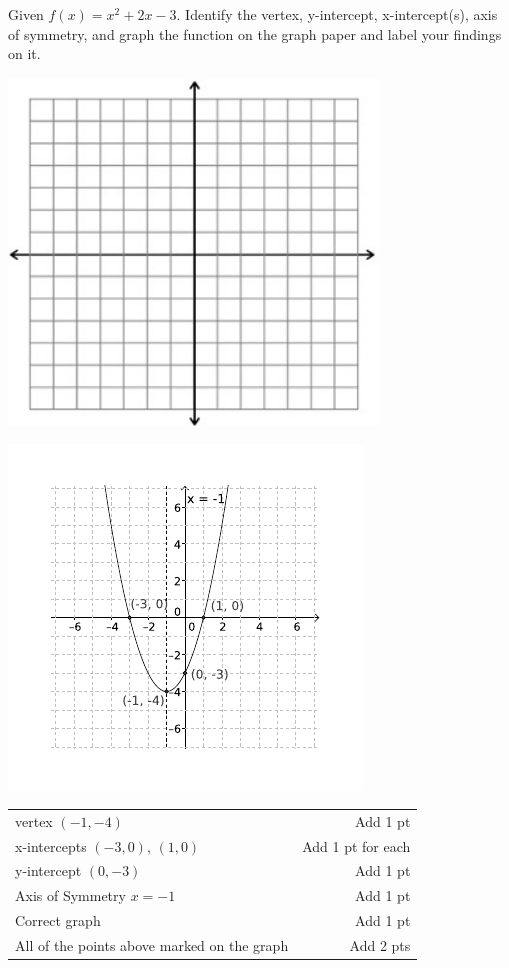 {
	Given $f(x)=x^2+2x-3$. Identify the vertex, y-intercept, x-intercept(s), axis of symmetry, and graph the function on the graph paper and label your findings on it.\begin{onlyproblem}\begin{center}\includegraphics{fig-graphpaper.png}\end{center}\end{onlyproblem} \begin{onlysolution}\begin{center}\includegraphics{fig100-18-d-answer}\end{center}\end{onlysolution}
}
{
	\begin{tabular}{l r}
	vertex $(-1, -4)$ & Add 1 pt\\
	x-intercepts $(-3,0)$, $(1, 0)$ & Add 1 pt for each\\
	y-intercept $(0,-3)$ & Add 1 pt\\
	Axis of Symmetry  $x=-1$ & Add 1 pt\\
	Correct graph & Add 1 pt\\
	All of the points above marked on the graph & Add 2 pts\\
	\end{tabular}
}
